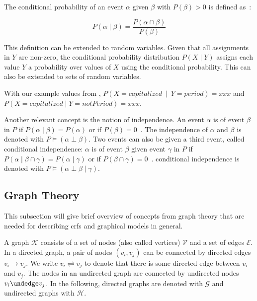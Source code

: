 \bigskip

The \gls{conditional probability} of an event $\alpha$ given $\beta$ with $P(\beta)>0$ is defined as~\cite{koller2009probabilistic}:

\begin{equation}
P(\alpha\mid\beta) = \frac{P(\alpha\cap\beta)}{P(\beta)}
\label{equ:conditional-probability}
\end{equation}

This definition can be extended to \glspl{random variable}.
Given that all assignments in $Y$ are non-zero, the \gls{conditional probability distribution} $P(X\mid Y)$ assigns each value $Y$ a probability over values of $X$ using the \gls{conditional probability}.
This can also be extended to sets of \glspl{random variable}.

With our example values from , $P(X=capitalized\ \mid\ Y=period)=xxx$ and $P(X=capitalized\mid Y=notPeriod)=xxx$.

\bigskip

Another relevant concept is the notion of \gls{independence}.
An \gls{event} $\alpha$ is  of \gls{event} $\beta$ in $P$ if $P(\alpha\mid\beta)=P(\alpha)$ or if $P(\beta)=0$~\cite{koller2009probabilistic}.
The \gls{independence} of $\alpha$ and $\beta$ is denoted with $P\models(\alpha\perp\beta)$.
Two \glspl{event} can also be  given a third \gls{event}, called \gls{conditional independence}:
$\alpha$ is  of \gls{event} $\beta$ given \gls{event} $\gamma$ in $P$ if $P(\alpha\mid\beta\cap\gamma)=P(\alpha\mid\gamma)$ or if $P(\beta\cap\gamma)=0$~\cite{koller2009probabilistic}.
\Gls{conditional independence} is denoted with $P\models(\alpha\perp\beta\mid\gamma)$.



\subsection{Graph Theory}\label{subsec:graph-theory}

This subsection will give brief overview of concepts from graph theory that are needed for describing \glspl{crf} and graphical models in general.

\bigskip

A \gls{graph} $\mathcal{K}$ consists of a set of \glspl{node} (also called vertices) $\mathcal{V}$ and a set of \glspl{edge} $\mathcal{E}$.
In a directed \gls{graph}, a pair of \glspl{node} $(v_i,v_j)$ can be connected by directed \glspl{edge} $v_i\to v_j$.
We write $v_i\rightleftharpoons v_j$ to denote that there is some directed edge between $v_i$ and $v_j$.
The \glspl{node} in an undirected graph are connected by undirected \glspl{node} $v_i\undedge v_j$.
In the following, directed \glspl{graph} are denoted with $\mathcal{G}$ and undirected \glspl{graph} with $\mathcal{H}$.

